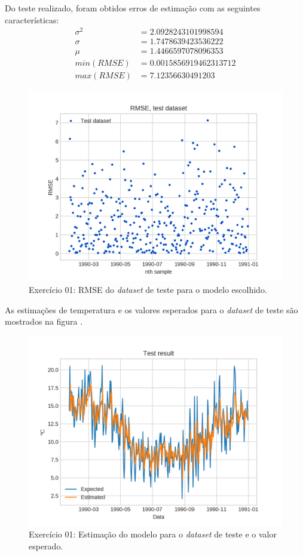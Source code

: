 \documentclass{article}
\begin{document}
    Do teste realizado, foram obtidos erros de estimação  com as seguintes características:
    \begin{align}
       \sigma^2&=2.0928243101998594\\
       \sigma&=1.7478639423536222\\
       \mu&=1.4466597078096353\\
       min(RMSE)&=0.0015856919462313712\\
       max(RMSE)&=7.12356630491203 
   \end{align}

   \begin{figure}[H]
        \centering
        \includegraphics[width=\linewidth]{ex01/model.png}
        \caption{Exercício 01: RMSE do \textit{dataset} de teste para o modelo escolhido.}
        \label{fig:ex1_kfold_rmse}
    \end{figure}
    As estimações de temperatura e os valores esperados para o \textit{dataset} de teste são
    mostrados na figura .
    \begin{figure}[H]
        \centering
        \includegraphics[width=\linewidth]{ex01/model_comp.png}
        \caption{Exercício 01: Estimação do modelo para o \textit{dataset} de teste e o valor esperado.}
        \label{fig:ex1_model_comp}
    \end{figure}
    
\end{document}
